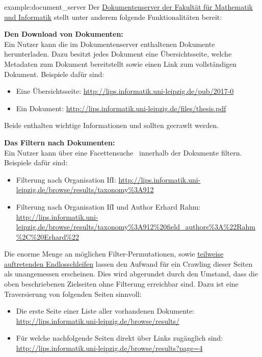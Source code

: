 \begin{example}{example:document_server}
	Der \href{http://lips.informatik.uni-leipzig.de/}{Dokumentenserver der Fakultät für Mathematik und Informatik}
	stellt unter anderem folgende Funktionalitäten bereit:

	\textbf{Den Download von Dokumenten:}\\
	Ein Nutzer kann die im Dokumentenserver enthaltenen Dokumente herunterladen.
	Dazu besitzt jedes Dokument eine Übersichtsseite, welche Metadaten zum Dokument bereitstellt sowie
	einen Link zum vollständigen Dokument.
	Beispiele dafür sind:
	\begin{itemize}
		\item Eine Übersichtsseite: \url{http://lips.informatik.uni-leipzig.de/pub/2017-0}
		\item Ein Dokument: \url{http://lips.informatik.uni-leipzig.de/files/thesis.pdf}
	\end{itemize}
	Beide enthalten wichtige Informationen und sollten gecrawlt werden.

	\textbf{Das Filtern nach Dokumenten:}\\
	Ein Nutzer kann über eine Facettensuche~\cite{wiki.facetted_search} innerhalb der Dokumente filtern.
	Beispiele dafür sind:
	\begin{itemize}
		\item Filterung nach \glqq Organisation IfI\grqq: \url{http://lips.informatik.uni-leipzig.de/browse/results/taxonomy%3A912}
		\item Filterung nach \glqq Organisation IfI und Author Erhard Rahm\grqq:\\ \url{http://lips.informatik.uni-leipzig.de/browse/results/taxonomy%3A912%20field_authors%3A%22Rahm%2C%20Erhard%22}
	\end{itemize}
	Die enorme Menge an möglichen Filter-Permutationen,
	sowie \href{http://se-pubs.dbs.uni-leipzig.de/pubs/results/0%200%200%200%20taxonomy%3A30%2C696}
		{teilweise auftretenden Endlosschleifen} lassen den Aufwand für ein Crawling dieser Seiten als unangemessen erscheinen.
	Dies wird abgerundet durch den Umstand, dass die oben beschriebenen Zielseiten ohne Filterung erreichbar sind.
	Dazu ist eine Traversierung von folgenden Seiten sinnvoll:
	\begin{itemize}
		\item Die erste Seite einer Liste aller vorhandenen Dokumente: \url{http://lips.informatik.uni-leipzig.de/browse/results/}
		\item Für welche nachfolgende Seiten direkt über Links zugänglich sind:
		\url{http://lips.informatik.uni-leipzig.de/browse/results?page=4}
	\end{itemize}
\end{example}

